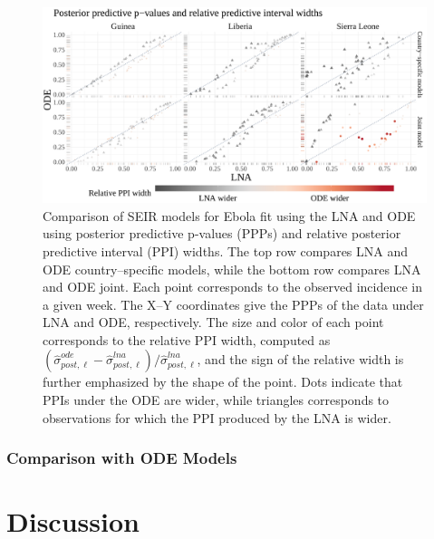 \begin{figure}[htbp]
	\centering
	\includegraphics[width=0.85\linewidth]{figures/ebola_lna_ode_ppicomp}
	\caption[Comparison of SEIR Ebola models fit via the LNA and ODE with posterior predictive p-values and relative predictive interval widths.]{Comparison of SEIR models for Ebola fit using the LNA and ODE using posterior predictive p-values (PPPs) and relative posterior predictive interval (PPI) widths. The top row compares LNA and ODE country--specific models, while the bottom row compares LNA and ODE joint. Each point corresponds to the observed incidence in a given week. The X--Y coordinates give the PPPs of the data under LNA and ODE, respectively. The size and color of each point corresponds to the relative PPI width, computed as $ (\widehat{\sigma}_{post,\ell}^{ode} - \widehat{\sigma}_{post,\ell}^{lna})/\widehat{\sigma}_{post,\ell}^{lna}$, and the sign of the relative width is further emphasized by the shape of the point. Dots indicate that PPIs under the ODE are wider, while triangles corresponds to observations for which the PPI produced by the LNA is wider.}
	\label{fig:ebola_lna_ode_ppicomp}
\end{figure}

\subsubsection{Comparison with ODE Models}
\label{subsubsec:lna_ode_comp}

\newpage
\section{Discussion}
\label{sec:lna_discussion}

